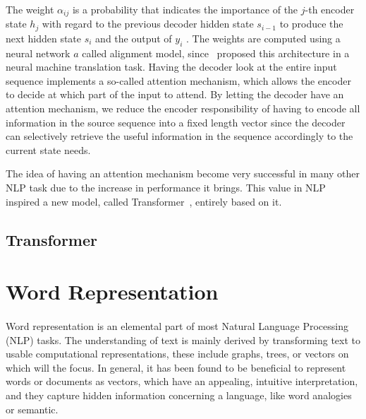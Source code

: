 The weight $\alpha_{i j}$ is a probability that indicates the importance of the $j$-th encoder state $h_j$ with regard to the previous decoder hidden state $s_{i-1}$ to produce the next hidden state $s_i$ and the output of $y_i$ . The weights are computed using a neural network $a$ called alignment model, since~\cite{bahdanau2014neural} proposed this architecture in a neural machine translation task. Having the decoder look at the entire input sequence implements a so-called attention mechanism, which allows the encoder to decide at which part of the input to attend.  By letting the decoder have an attention mechanism, we reduce the encoder responsibility of having to encode all information in the source sequence into a fixed length vector since the decoder can selectively retrieve the useful information in the sequence accordingly to the current state needs.

The idea of having an attention mechanism become very successful in many other NLP task due to the increase in performance it brings. This value in NLP inspired a new model, called Transformer~\citep{vaswani2017attention}, entirely based on it. 

\subsection{Transformer}

\section{Word Representation}
\label{sec:word_embedding}
\paragraph{}
Word representation is an elemental part of most Natural Language Processing (NLP) tasks. The understanding of text is mainly derived by transforming text to usable computational representations, these include graphs, trees, or vectors on which will the focus.   In general, it has been found to be beneficial to represent words or documents as vectors, which have an appealing, intuitive interpretation, and they capture hidden information concerning a language, like word analogies or semantic. 


